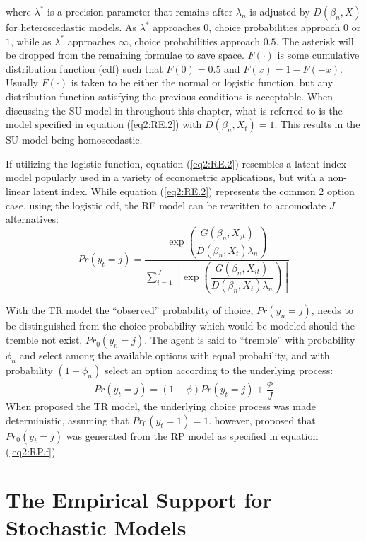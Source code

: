 \documentclass[11pt,a4paper]{report}
\newcommand\Prob{\ensuremath{\mathit{Pr}}}  %
\begin{document}
\noindent where $\lambda^*$ is a precision parameter that remains after $\lambda_n$ is adjusted by $D(\beta_n,X)$ for heteroscedastic models.
As $\lambda^*$ approaches $0$, choice probabilities approach $0$ or $1$, while as $\lambda^*$ approaches $\infty$, choice probabilities approach $0.5$.
The asterisk will be dropped from the remaining formulae to save space.
$F(\cdot)$ is some cumulative distribution function (cdf) such that $F(0) = 0.5$ and $F(x) = 1 - F(-x)$.
Usually $F(\cdot)$ is taken to be either the normal or logistic function, but any distribution function satisfying the previous conditions is acceptable.
When discussing the SU model in throughout this chapter, what is referred to is the model specified in equation (\ref{eq2:RE.2}) with $D(\beta_n,X_t) = 1$.
This results in the SU model being homoscedastic.

If utilizing the logistic function, equation (\ref{eq2:RE.2}) resembles a latent index model popularly used in a variety of econometric applications, but with a non-linear latent index.
While equation (\ref{eq2:RE.2}) represents the common 2 option case, using the logistic cdf, the RE model can be rewritten to accomodate $J$ alternatives:
\begin{equation}
	\label{eq2:RE.f}
	{\Prob}(y_t=j) =\dfrac{\exp\!\left( \dfrac{ G(\beta_n,X_{jt}) }{ D(\beta_n,X_{t})\lambda_n }  \right)}{ \displaystyle\sum_{i=1}^J \left[ \exp\!\left( \dfrac{ G(\beta_n,X_{it}) }{ D(\beta_n,X_{t})\lambda_n }  \right)  \right]  }
\end{equation}

With the TR model the \enquote{observed} probability of choice, ${\Prob}(y_n=j)$, needs to be distinguished from the choice probability which would be modeled should the tremble not exist, ${\Prob}_0(y_n=j)$.
The agent is said to \enquote{tremble} with probability $\phi_n$ and select among the available options with equal probability, and with probability $(1-\phi_n)$ select an option according to the underlying process:
\begin{equation}
	\label{eq2:TR.f}
	{\Prob}(y_t=j) = (1-\phi) {\Prob}(y_t=j) + \frac{\phi}{J}
\end{equation}
When \textcite{Harless1994} proposed the TR model, the underlying choice process was made deterministic, assuming that ${\Prob}_0(y_t=1) = 1$.
\textcite{Loomes2002} however, proposed that ${\Prob}_0(y_t=j)$ was generated from the RP model as specified in equation (\ref{eq2:RP.f}).

\section{The Empirical Support for Stochastic Models}
\end{document}
